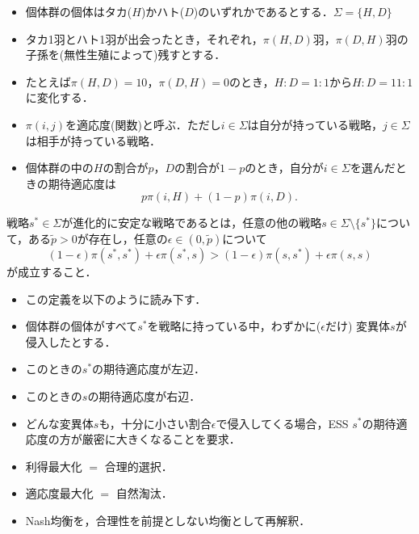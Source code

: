 \documentclass[uplatex,12pt,dvipdfmx,xcolor=svgnames]{beamer}
\begin{document}
\begin{frame}[t]{\secIV}

\begin{itemize}
	\item 個体群の個体はタカ($H$)かハト($D$)のいずれかであるとする．$\Sigma=\{H, D\}$
	\item タカ1羽とハト1羽が出会ったとき，それぞれ，$\pi(H, D)$羽，$\pi(D, H)$羽の子孫を(無性生殖によって)残すとする．
	\item たとえば$\pi(H, D)=10$，$\pi(D, H)=0$のとき，$H:D=1:1$から$H:D=11:1$に変化する．
	\item $\pi(i, j)$を適応度(関数)と呼ぶ．ただし$i\in\Sigma$は自分が持っている戦略，$j\in\Sigma$は相手が持っている戦略．
	\item 個体群の中の$H$の割合が$p$，$D$の割合が$1-p$のとき，自分が$i\in\Sigma$を選んだときの期待適応度は
		\begin{equation*}
			p\pi(i, H) + (1-p)\pi(i, D).
		\end{equation*}
\end{itemize}

\begin{definition}
	\quad
	戦略$s^*\in\Sigma$が進化的に安定な戦略であるとは，任意の他の戦略$s \in\Sigma\setminus\{s^*\}$について，ある$\tilde{p}>0$が存在し，任意の$\epsilon \in(0, \tilde{p})$について
		\begin{equation}
			(1-\epsilon)\pi(s^*, s^*) + \epsilon\pi(s^*, s)
			>
			(1-\epsilon)\pi(s, s^*) + \epsilon\pi(s, s)
			\label{eq:ESS}
		\end{equation}
	が成立すること．
\end{definition}

\begin{itemize}
	\item この定義を以下のように読み下す．
	\item 個体群の個体がすべて$s^*$を戦略に持っている中，わずかに($\epsilon$だけ) 変異体$s$が侵入したとする．
	\item このときの$s^*$の期待適応度が左辺．
	\item このときの$s$の期待適応度が右辺．
	\item どんな変異体$s$も，十分に小さい割合$\epsilon$で侵入してくる場合，ESS $s^*$の期待適応度の方が厳密に大きくなることを要求．
	\vspace{3mm}
	\item 利得最大化 $=$ 合理的選択．
	\item 適応度最大化 $=$ 自然淘汰．
	\item Nash均衡を，合理性を前提としない均衡として再解釈．
\end{itemize}
	
\end{frame}
\end{document}
